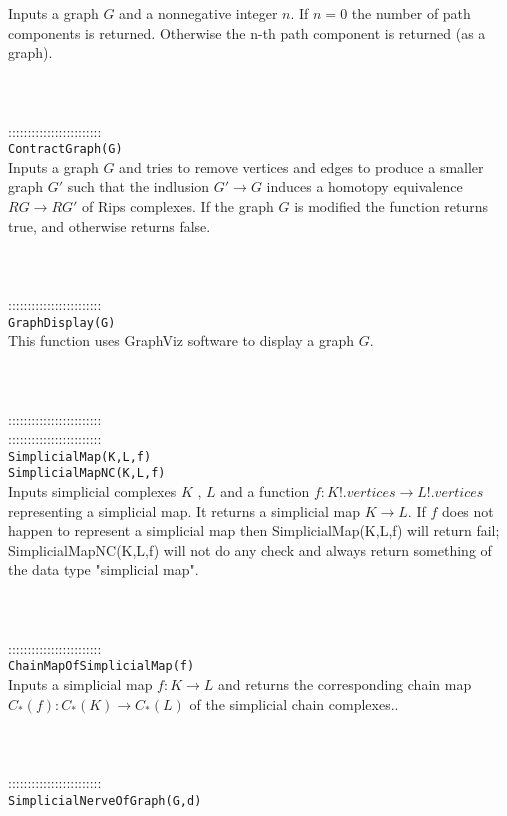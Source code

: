 \documentclass[a4paper,11pt]{report}
\begin{document}
{ Inputs a graph $G$ and a nonnegative integer $n$. If $n=0$ the number of path components is returned. Otherwise the n-th path component
is returned (as a graph). \\
 \\
 \\
 \\
 ::::::::::::::::::::::::\\
 \texttt{ContractGraph(G)}\\
 

 Inputs a graph $G$ and tries to remove vertices and edges to produce a smaller graph $G'$ such that the indlusion $G' \rightarrow G$ induces a homotopy equivalence $RG \rightarrow RG'$ of Rips complexes. If the graph $G$ is modified the function returns true, and otherwise returns false. \\
 \\
 \\
 \\
 ::::::::::::::::::::::::\\
 \texttt{GraphDisplay(G)}\\
 

 This function uses GraphViz software to display a graph $G$. \\
 \\
 \\
 \\
 ::::::::::::::::::::::::\\
 ::::::::::::::::::::::::\\
 \texttt{SimplicialMap(K,L,f)}\\
 \texttt{SimplicialMapNC(K,L,f)}\\
 

 Inputs simplicial complexes $K$ , $L$ and a function $f\colon K!.vertices \rightarrow L!.vertices$ representing a simplicial map. It returns a simplicial map $K \rightarrow L$. If $f$ does not happen to represent a simplicial map then SimplicialMap(K,L,f) will
return fail; SimplicialMapNC(K,L,f) will not do any check and always return
something of the data type "simplicial map". \\
 \\
 \\
 \\
 ::::::::::::::::::::::::\\
 \texttt{ChainMapOfSimplicialMap(f)}\\
 

 Inputs a simplicial map $f\colon K \rightarrow L$ and returns the corresponding chain map $C_\ast(f) \colon C_\ast(K) \rightarrow C_\ast(L)$ of the simplicial chain complexes.. \\
 \\
 \\
 \\
 ::::::::::::::::::::::::\\
 \texttt{SimplicialNerveOfGraph(G,d)}\\
 

}
\end{document}
